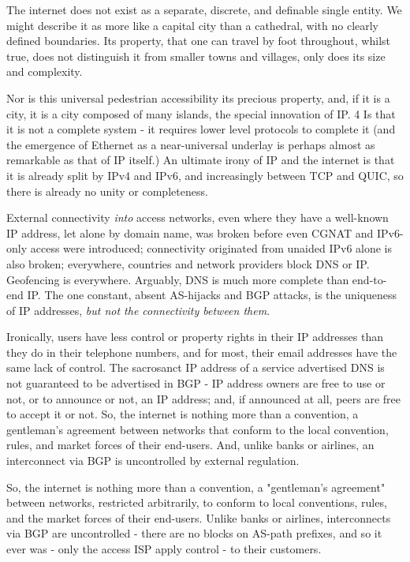 The internet does not exist as a separate, discrete, and definable single entity.
We might describe it as more like a capital city than a cathedral, with no clearly defined boundaries. Its property, that one can travel by foot throughout, whilst true, does not distinguish it from smaller towns and villages, only does its size and complexity.

Nor is this universal pedestrian accessibility its precious property, and, if it is a city, it is a city composed of many islands, the special innovation of IP. 4 Is that it is not a complete system - it requires lower level protocols to complete it (and the emergence of Ethernet as a near-universal underlay is perhaps almost as remarkable as that of IP itself.)
An ultimate irony of IP and the internet is that it is already split by IPv4 and IPv6, and increasingly between TCP and QUIC, so there is already no unity or completeness.

External connectivity \textit{into} access networks, even where they have a well-known IP address, let alone by domain name, was broken before even CGNAT and IPv6-only access were introduced; connectivity originated from unaided IPv6 alone is also broken;  everywhere, countries and network providers block DNS or IP. Geofencing is everywhere. Arguably, DNS is much more complete than end-to-end IP. The one constant, absent AS-hijacks and BGP attacks, is the uniqueness of IP addresses, \textit{but not the connectivity between them}.

Ironically, users have less control or property rights in their IP addresses than they do in their telephone numbers, and for most,  their email addresses have the same lack of control. The sacrosanct IP address of a service advertised DNS is not guaranteed to be advertised in BGP -  IP address owners are free to use or not, or to announce or not, an IP address; and, if announced at all, peers are free to accept it or not. So, the internet is nothing more than a convention, a gentleman's agreement between networks that conform to the local convention, rules, and market forces of their end-users. And, unlike banks or airlines, an interconnect via BGP is uncontrolled  by external regulation.

So, the internet is nothing more than a convention, a "gentleman's agreement" between networks, restricted arbitrarily, to conform to local conventions, rules, and the market forces of their end-users. Unlike banks or airlines, interconnects via BGP are uncontrolled - there are no blocks on AS-path prefixes, and so it ever was - only the access ISP apply control - to their customers.


